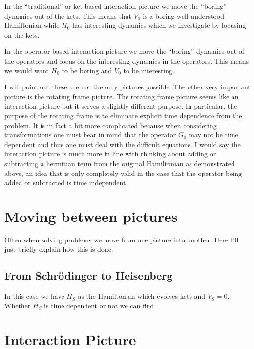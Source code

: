 \documentclass[12pt]{article}
\begin{document}
In the ``traditional'' or ket-based interaction picture we move the ``boring'' dynamics out of the kets. This means that $V_0$ is a boring well-understood Hamiltonian while $H_0$ has interesting dynamics which we investigate by focusing on the kets.

In the operator-based interaction picture we move the ``boring'' dynamics out of the operators and focus on the interesting dynamics in the operators. This means we would want $H_0$ to be boring and $V_0$ to be interesting.

I will point out these are not the only pictures possible. The other very important picture is the rotating frame picture. The rotating frame picture seems like an interaction picture but it serves a slightly different purpose. In particular, the purpose of the rotating frame is to eliminate explicit time dependence from the problem. It is in fact a bit more complicated because when considering transformations one must bear in mind that the operator $G_0$ may not be time dependent and thus one must deal with the difficult equations. I would say the interaction picture is much more in line with thinking about adding or subtracting a hermitian term from the original Hamiltonian as demonstrated above, an idea that is only completely valid in the case that the operator being added or subtracted is time independent.

\section{Moving between pictures}

Often when solving problems we move from one picture into another. Here I'll just briefly explain how this is done.

\subsection{From Schr{\"o}dinger to Heisenberg}

In this case we have $H_S$ as the Hamiltonian which evolves kets and $V_S =0$. Whether $H_S$ is time dependent or not we can find 




\section{Interaction Picture}
\end{document}
